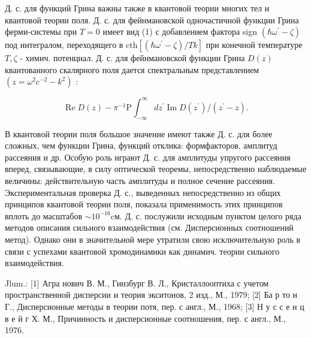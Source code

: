 \documentclass[10pt]{article}
\begin{document}
Д. с. для функций Грина важны также в квантовой теории многих тел и квантовой теории поля. Д. с. для фейнмановской одночастичной функции Грина ферми-системы при $T=0$ имеет вид (1) с добавлением фактора sign $\left(\hbar \omega^{\prime}-\zeta\right)$ под интегралом, переходящего в $\mathrm{cth}\left[\left(\hbar \omega^{\prime}-\zeta\right) / T k\right]$ при конечной температуре $T, \zeta$ - химич. потенциал. Д. с. для фейнмановской функции Грина $D(z)$ квантованного скалярного поля дается спектральным представлением $\left(z=\omega^{2} c^{-2}-k^{2}\right)$ :



\[

\operatorname{Re} D(z)-\pi^{-1} \mathrm{P} \int_{-\infty}^{\infty} d z^{\prime} \operatorname{Im} D\left(z^{\prime}\right) /\left(z^{\prime}-z\right) .

\]



В квантовой теории поля большое значение имеют также Д. с. для более сложных, чем функции Грина, функций отклика: формфакторов, амплитуд рассеяния и др. Особую роль играют Д. с. для амплитуды упругого рассеяния вперед, связывающие, в силу оптической теоремы, непосредственно наблюдаемые величины: действительную часть амплитуды и полное сечение рассеяния. Экспериментальная проверка Д. с., выведенных непосредственно из общих принципов квантовой теории поля, показала применимость этих принципов вплоть до масштабов $\sim 10^{-16} \mathrm{cм}$. Д. с. послужили исходным пунктом целого ряда методов описания сильного взаимодействия (см. Дисперсионных соотношений метод). Однако они в значительной мере утратили свою исключительную роль в связи с успехами квантовой хромодинамики как динамич. теории сильного взаимодействия.



Jlum.: [1] Агра нович В. М., Гинзбург В. Л., Кристаллооптиха с учетом пространственной дисперсии и теория экситонов, 2 изд., М., 1979; [2] Ба р то н Г., Дисперсионные методы в теории потя, пер. с англ., М., 1968; [3] Н у с с е н ц в е й г Х. М., Причинность и дисперсионные соотношения, пер. с англ., М., 1976.
\end{document}
